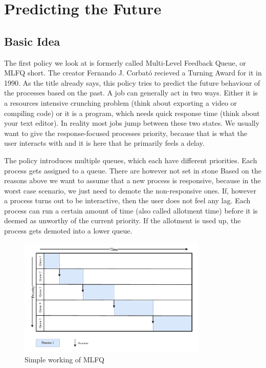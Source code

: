 \chapter{Predicting the Future}

\section{Basic Idea}

The first policy we look at is formerly called Multi-Level Feedback Queue, or MLFQ short. The creator Fernando J. Corbató recieved a Turning Award for it in 1990. 
As the title already says, this policy tries to predict the future behaviour of the processes based on the past.
A job can generally act in two ways.
Either it is a resources intensive crunching problem (think about exporting a video or compiling code) or it is a program, which needs quick response time (think about your text editor).
In reality most jobs jump between these two states.
We usually want to give the response-focused processes priority, because that is what the user interacts with and it is here that he primarily feels a delay.

The policy introduces multiple queues, which each have different priorities.
Each process gets assigned to a queue. There are however not set in stone
Based on the reasons above we want to assume that a new process is responsive, because in the worst case scenario, we just need to demote the non-responsive ones.
If, however a process turns out to be interactive, then the user does not feel any lag. 
Each process can run a certain amount of time (also called allotment time) before it is deemed as unworthy of the current priority.
If the allotment is used up, the process gets demoted into a lower queue.

\begin{figure}[h]
    \centering
    \includegraphics[width=0.8\textwidth]{Assets/MLFQ-Example-1.pdf}
    \caption{Simple working of MLFQ}
    \label{fig:mlfq-example-1}
\end{figure}


